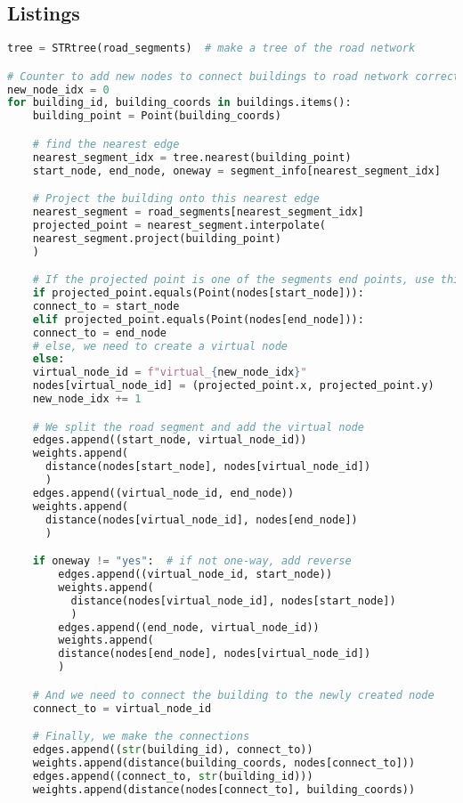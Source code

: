 \subsection{Listings}
\begin{lstlisting}[language=Python, caption={The algorithm to extract the edges to connect the buildings to the road network}, label={lst:python-edges}]
tree = STRtree(road_segments)  # make a tree of the road network

# Counter to add new nodes to connect buildings to road network correctly
new_node_idx = 0
for building_id, building_coords in buildings.items():
    building_point = Point(building_coords)

    # find the nearest edge
    nearest_segment_idx = tree.nearest(building_point)  
    start_node, end_node, oneway = segment_info[nearest_segment_idx]

    # Project the building onto this nearest edge
    nearest_segment = road_segments[nearest_segment_idx]
    projected_point = nearest_segment.interpolate(
	nearest_segment.project(building_point)
    )

    # If the projected point is one of the segments end points, use this
    if projected_point.equals(Point(nodes[start_node])):
	connect_to = start_node
    elif projected_point.equals(Point(nodes[end_node])):
	connect_to = end_node
    # else, we need to create a virtual node
    else:
	virtual_node_id = f"virtual_{new_node_idx}"
	nodes[virtual_node_id] = (projected_point.x, projected_point.y)
	new_node_idx += 1

	# We split the road segment and add the virtual node
	edges.append((start_node, virtual_node_id))
	weights.append(
	  distance(nodes[start_node], nodes[virtual_node_id])
	  )
	edges.append((virtual_node_id, end_node))
	weights.append(
	  distance(nodes[virtual_node_id], nodes[end_node])
	  )

	if oneway != "yes":  # if not one-way, add reverse
	    edges.append((virtual_node_id, start_node))
	    weights.append(
	      distance(nodes[virtual_node_id], nodes[start_node])
	      )
	    edges.append((end_node, virtual_node_id))
	    weights.append(
	    distance(nodes[end_node], nodes[virtual_node_id])
	    )

	# And we need to connect the building to the newly created node
	connect_to = virtual_node_id

    # Finally, we make the connections
    edges.append((str(building_id), connect_to))
    weights.append(distance(building_coords, nodes[connect_to]))
    edges.append((connect_to, str(building_id)))
    weights.append(distance(nodes[connect_to], building_coords))
\end{lstlisting}
